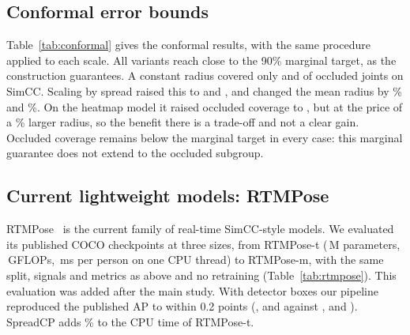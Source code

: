\documentclass[preprint,11pt]{elsarticle}
\newcommand{\method}{SpreadCP}
\begin{document}
\subsection{Conformal error bounds}

Table~\ref{tab:conformal} gives the conformal results, with the same procedure applied to each scale.
All variants reach close to the 90\% marginal target, as the construction guarantees. A constant radius covered only
\CovOccZsSimccMbvThreeConstant{} and \CovOccZsSimccRFiveZeroConstant{} of occluded joints on SimCC.
Scaling by spread raised this to \CovOccZsSimccMbvThreeDist{} and \CovOccZsSimccRFiveZeroDist{}, and
changed the mean radius by \RadiusChangeZsSimccMbvThree\% and \RadiusChangeZsSimccRFiveZero\%. On
the heatmap model it raised occluded coverage to \CovOccZsHmRFiveZeroDist{}, but at the price of a
\RadiusChangeZsHmRFiveZero\% larger radius, so the benefit there is a trade-off and not a clear gain.
Occluded coverage remains below the marginal target in every case: this marginal guarantee does not
extend to the occluded subgroup.

\begin{table}[t]
\centering\small
\caption{Split-conformal regions at 90\% target coverage. Radii are in normalised error units.}
\label{tab:conformal}
\end{table}

\subsection{Current lightweight models: RTMPose}\label{sec:rtmpose}

RTMPose~\cite{jiang2023rtmpose} is the current family of real-time SimCC-style models. We evaluated its
published COCO checkpoints at three sizes, from RTMPose-t (\ParamsRtmposeT{}\,M parameters,
\FlopsRtmposeT{}\,GFLOPs, \CpuOneRtmposeT{}\,ms per person on one CPU thread) to RTMPose-m, with the same
split, signals and metrics as above and no retraining (Table~\ref{tab:rtmpose}). This evaluation was
added after the main study. With detector boxes our pipeline reproduced the published AP to within 0.2
points (\ApDetZsRtmposeT{}, \ApDetZsRtmposeS{} and \ApDetZsRtmposeM{} against \ApPubZsRtmposeT{},
\ApPubZsRtmposeS{} and \ApPubZsRtmposeM{}). \method{} adds \MethodCpuPctRtmT\% to the CPU time of
RTMPose-t.
\end{document}
